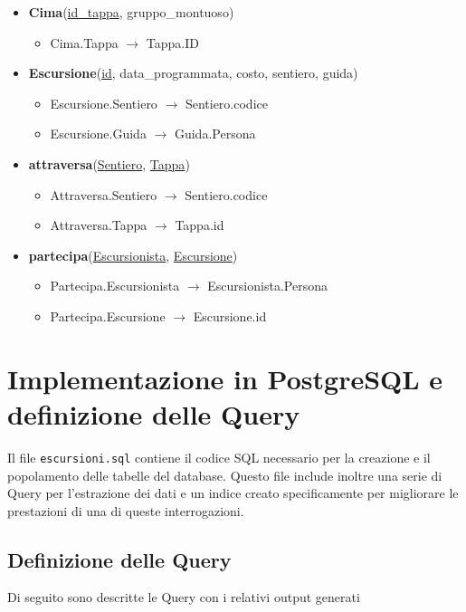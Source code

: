 \documentclass[10pt, a4paper]{article}
\begin{document}
\begin{itemize}
    \item \textbf{Cima}(\underline{id\_tappa}, gruppo\_montuoso)
    \begin{itemize}
        \item Cima.Tappa $\rightarrow$ Tappa.ID
    \end{itemize}

    \item \textbf{Escursione}(\underline{id}, data\_programmata, costo, sentiero, guida)
    \begin{itemize}
        \item Escursione.Sentiero $\rightarrow$ Sentiero.codice
        \item Escursione.Guida $\rightarrow$ Guida.Persona
    \end{itemize}

    \item \textbf{attraversa}(\underline{Sentiero}, \underline{Tappa})
    \begin{itemize}
        \item Attraversa.Sentiero $\rightarrow$ Sentiero.codice
        \item Attraversa.Tappa $\rightarrow$ Tappa.id
    \end{itemize}

    \item \textbf{partecipa}(\underline{Escursionista}, \underline{Escursione})
    \begin{itemize}
        \item Partecipa.Escursionista $\rightarrow$ Escursionista.Persona
        \item Partecipa.Escursione $\rightarrow$ Escursione.id
    \end{itemize}
\end{itemize}

\section{Implementazione in PostgreSQL e definizione delle Query}
Il file \texttt{escursioni.sql} contiene il codice SQL necessario per la creazione e il popolamento delle tabelle del database. Questo file include inoltre una serie di Query per l’estrazione dei dati e un indice creato specificamente per migliorare le prestazioni di una di queste interrogazioni.

\subsection{Definizione delle Query}
Di seguito sono descritte le Query con i relativi output generati
\end{document}
